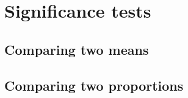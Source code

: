 %
%
%
\section{Significance tests}

	\subsection{Comparing two means}

	\subsection{Comparing two proportions}
